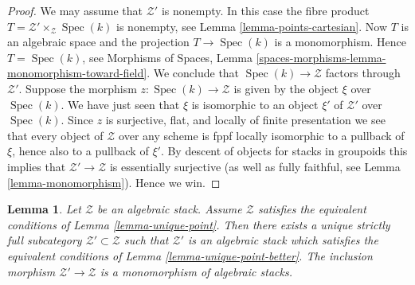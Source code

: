 \documentclass{stacks-project}
\theoremstyle{plain}
\newtheorem{lemma}[subsection]{Lemma}
\theoremstyle{definition}
\theoremstyle{remark}
\numberwithin{equation}{subsection}
\def\Spec{\mathop{\mathrm{Spec}}}
\begin{document}
\begin{proof}
We may assume that $\mathcal{Z}'$ is nonempty. In this case the
fibre product $T = \mathcal{Z}' \times_\mathcal{Z} \Spec(k)$
is nonempty, see
Lemma \ref{lemma-points-cartesian}.
Now $T$ is an algebraic space and the projection $T \to \Spec(k)$
is a monomorphism. Hence $T = \Spec(k)$, see
Morphisms of Spaces, Lemma
\ref{spaces-morphisms-lemma-monomorphism-toward-field}.
We conclude that $\Spec(k) \to \mathcal{Z}$ factors through
$\mathcal{Z}'$. Suppose the morphism $z : \Spec(k) \to \mathcal{Z}$
is given by the object $\xi$ over $\Spec(k)$. We have just seen that
$\xi$ is isomorphic to an object $\xi'$ of $\mathcal{Z}'$ over
$\Spec(k)$. Since $z$
is surjective, flat, and locally of finite presentation we see that
every object of $\mathcal{Z}$ over any scheme is fppf locally isomorphic
to a pullback of $\xi$, hence also to a pullback of $\xi'$. By descent of
objects for stacks in groupoids this implies that
$\mathcal{Z}' \to \mathcal{Z}$ is essentially surjective (as well as
fully faithful, see
Lemma \ref{lemma-monomorphism}).
Hence we win.
\end{proof}

\begin{lemma}
\label{lemma-improve-unique-point}
Let $\mathcal{Z}$ be an algebraic stack. Assume $\mathcal{Z}$ satisfies
the equivalent conditions of
Lemma \ref{lemma-unique-point}.
Then there exists a unique strictly full subcategory
$\mathcal{Z}' \subset \mathcal{Z}$ such that
$\mathcal{Z}'$ is an algebraic stack which satisfies the equivalent
conditions of
Lemma \ref{lemma-unique-point-better}.
The inclusion morphism $\mathcal{Z}' \to \mathcal{Z}$ is a monomorphism
of algebraic stacks.
\end{lemma}
\end{document}
